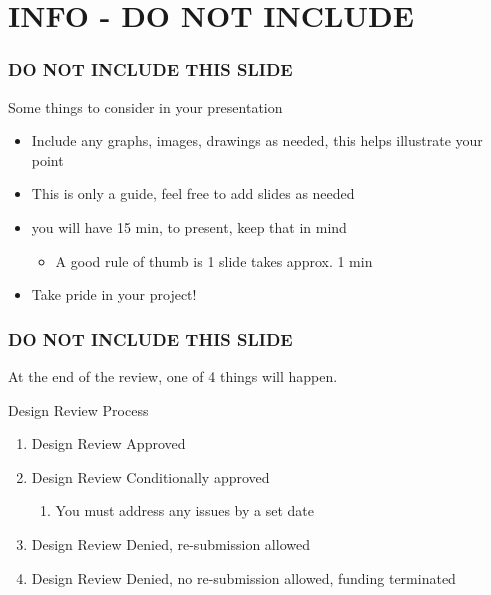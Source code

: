 \documentclass[11pt]{beamer}
\begin{document}
\section{INFO - DO NOT INCLUDE}
\begin{frame}
\frametitle{DO NOT INCLUDE THIS SLIDE}
Some things to consider in your presentation
\begin{itemize}
\item Include any graphs, images, drawings as needed, this helps illustrate your point
\item This is only a guide, feel free to add slides as needed
\item you will have 15 min, to present, keep that in mind
\begin{itemize}
\item A good rule of thumb is 1 slide takes approx. 1 min
\end{itemize}
\item Take pride in your project!
\end{itemize}
\end{frame}

\begin{frame}
\frametitle{DO NOT INCLUDE THIS SLIDE}
At the end of the review, one of 4 things will happen.
\begin{block}{Design Review Process}
\begin{enumerate}
\item Design Review Approved
\item Design Review Conditionally approved
\begin{enumerate}
\item You must address any issues by a set date
\end{enumerate}
\item Design Review Denied, re-submission allowed
\item Design Review Denied, no re-submission allowed, funding terminated
\end{enumerate}
\end{block}
\end{frame}
\end{document}
